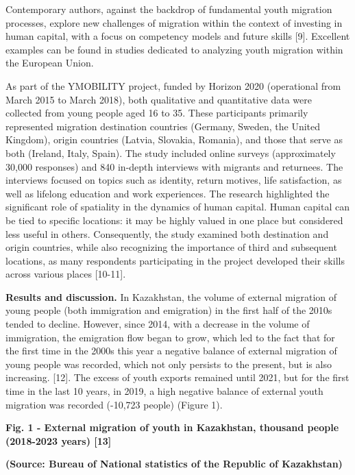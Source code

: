 Contemporary authors, against the backdrop of fundamental youth
migration processes, explore new challenges of migration within the
context of investing in human capital, with a focus on competency models
and future skills {[}9{]}. Excellent examples can be found in studies
dedicated to analyzing youth migration within the European Union.

As part of the YMOBILITY project, funded by Horizon 2020 (operational
from March 2015 to March 2018), both qualitative and quantitative data
were collected from young people aged 16 to 35. These participants
primarily represented migration destination countries (Germany, Sweden,
the United Kingdom), origin countries (Latvia, Slovakia, Romania), and
those that serve as both (Ireland, Italy, Spain). The study included
online surveys (approximately 30,000 responses) and 840 in-depth
interviews with migrants and returnees. The interviews focused on topics
such as identity, return motives, life satisfaction, as well as lifelong
education and work experiences. The research highlighted the significant
role of spatiality in the dynamics of human capital. Human capital can
be tied to specific locations: it may be highly valued in one place but
considered less useful in others. Consequently, the study examined both
destination and origin countries, while also recognizing the importance
of third and subsequent locations, as many respondents participating in
the project developed their skills across various places {[}10-11{]}.

{\bfseries Results and discussion.} In Kazakhstan, the volume of external
migration of young people (both immigration and emigration) in the first
half of the 2010s tended to decline. However, since 2014, with a
decrease in the volume of immigration, the emigration flow began to
grow, which led to the fact that for the first time in the 2000s this
year a negative balance of external migration of young people was
recorded, which not only persists to the present, but is also
increasing. {[}12{]}. The excess of youth exports remained until 2021,
but for the first time in the last 10 years, in 2019, a high negative
balance of external youth migration was recorded (-10,723 people)
(Figure 1).

{\bfseries Fig. 1 - External migration of youth in Kazakhstan, thousand
people (2018-2023 years) {[}13{]}}

{\bfseries (Source: Bureau of National statistics of the Republic of
Kazakhstan)}

